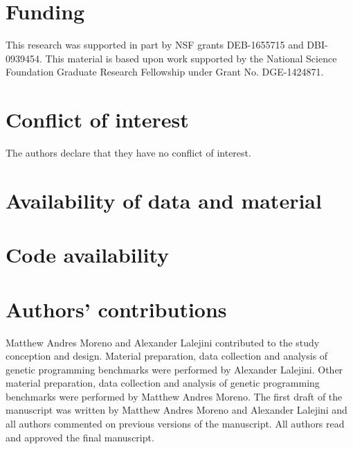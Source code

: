 \section*{Funding}

This research was supported in part by NSF grants DEB-1655715 and DBI-0939454.
This material is based upon work supported by the National Science Foundation Graduate Research Fellowship under Grant No. DGE-1424871.


\section*{Conflict of interest}

The authors declare that they have no conflict of interest.

\section*{Availability of data and material}

\section*{Code availability} 

\section*{Authors' contributions} Matthew Andres Moreno and Alexander Lalejini contributed to the study conception and design.
Material preparation, data collection and analysis of genetic programming benchmarks were performed by Alexander Lalejini.
Other material preparation, data collection and analysis of genetic programming benchmarks were performed by Matthew Andres Moreno.
The first draft of the manuscript was written by Matthew Andres Moreno and Alexander Lalejini and all authors commented on previous versions of the manuscript.
All authors read and approved the final manuscript.
